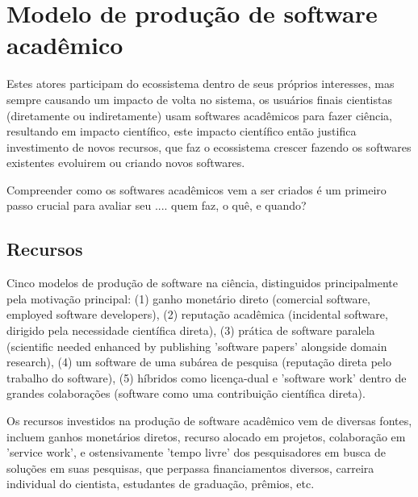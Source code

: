 \section{Modelo de produção de software acadêmico}


Estes atores participam do ecossistema dentro de seus próprios interesses, mas
sempre causando um impacto de volta no sistema, os usuários finais cientistas
(diretamente ou indiretamente) usam softwares acadêmicos para fazer ciência,
resultando em impacto científico, este impacto científico então justifica
investimento de novos recursos, que faz o ecossistema crescer fazendo os softwares
existentes evoluirem ou criando novos softwares.

%

Compreender como os softwares acadêmicos vem a ser criados é um primeiro
passo crucial para avaliar seu .... quem faz, o quê, e quando?

\subsection{Recursos}

Cinco modelos de produção de software na ciência, distinguidos principalmente
pela motivação principal: (1) ganho monetário direto (comercial software,
employed software developers), (2) reputação acadêmica (incidental software,
dirigido pela necessidade científica direta), (3) prática de software paralela
(scientific needed enhanced by publishing 'software papers' alongside domain research),
(4) um software de uma subárea de pesquisa (reputação direta pelo trabalho do software),
(5) híbridos como licença-dual e 'software work' dentro de grandes colaborações
(software como uma contribuição científica direta).

Os recursos investidos na produção de software acadêmico vem de diversas
fontes, incluem ganhos monetários diretos, recurso alocado em projetos,
colaboração em 'service work', e ostensivamente 'tempo livre' dos pesquisadores
em busca de soluções em suas pesquisas, que perpassa financiamentos diversos,
carreira individual do cientista, estudantes de graduação, prêmios, etc.

